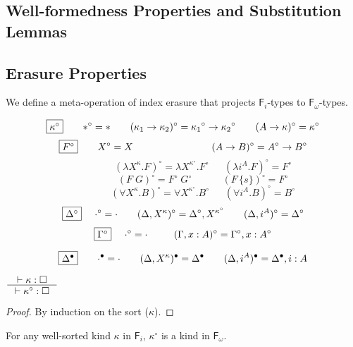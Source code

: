 \documentclass{llncs}
\newcommand{\Fi}{\ensuremath{\mathsf{F}_i}}
\newcommand{\Fw}{\ensuremath{\mathsf{F}_\omega}}
\begin{document}
\subsection{Well-formedness Properties and Substitution Lemmas} \label{ssec:wf}




\subsection{Erasure Properties} \label{ssec:erasure}

We define a meta-operation of index erasure that projects $\Fi$-types
to $\Fw$-types.

\begin{definition}\label{def:ierase}
\[ \fbox{$\kappa^\circ$}
 ~~~~ ~~
 *^\circ =
 *
 ~~~~ ~~
 (\kappa_1 -> \kappa_2)^\circ =
 {\kappa_1}^\circ -> {\kappa_2}^\circ
 ~~~~ ~~
 (A -> \kappa)^\circ =
 \kappa^\circ
\]
\[ \fbox{$F^\circ$}
 ~~~~ ~~
 X^\circ =
 X
 ~~~~ ~~~~ ~~~~ ~~~~ ~~~~ ~~~~
 (A -> B)^\circ =
 A^\circ -> B^\circ
\]
\[ \qquad \qquad
 (\lambda X^\kappa.F)^\circ =
 \lambda X^{\kappa^\circ}.F^\circ
 ~~~~ ~~~
 (\lambda i^A.F)^\circ =
 F^\circ
\]
\[ \qquad \qquad
 (F\;G)^\circ =
 F^\circ\;G^\circ
 ~~~~ ~~~~ ~~~~ ~~
 (F\,\{s\})^\circ =
 F^\circ
\]
\[ \qquad \qquad
 (\forall X^\kappa . B)^\circ =
 \forall X^{\kappa^\circ} . B^\circ
 ~~~~ ~~~
 (\forall i^A . B)^\circ =
 B^\circ
\]
\[ \fbox{$\Delta^\circ$}
 ~~~~
 \cdot^\circ = \cdot
 ~~~~ ~~
 (\Delta,X^\kappa)^\circ = \Delta^\circ,X^{\kappa^\circ}
 ~~~~ ~~
 (\Delta,i^A)^\circ = \Delta^\circ
\]
\[ \fbox{$\Gamma^\circ$}
 ~~~~
 \cdot^\circ = \cdot
 ~~~~ ~~~~
 (\Gamma,x:A)^\circ = \Gamma^\circ,x:A^\circ
\]
\end{definition}

\begin{definition}
	\[ \fbox{$\Delta^\bullet$} ~~~~ ~~ \cdot^\bullet = \cdot \qquad
	(\Delta,X^\kappa)^\bullet = \Delta^\bullet \qquad
	(\Delta,i^A)^\bullet = \Delta^\bullet,i:A
\]
\end{definition}



\begin{theorem}
\label{thm:ierasesorting}
	$\inference{|- \kappa : \square}{|- \kappa^\circ : \square}$
\end{theorem}
\begin{proof}
	By induction on the sort ($\kappa$).
\end{proof}
\begin{remark}
For any well-sorted kind $\kappa$ in \Fi,
$\kappa^\circ$ is a kind in \Fw.
\end{remark}
\end{document}
